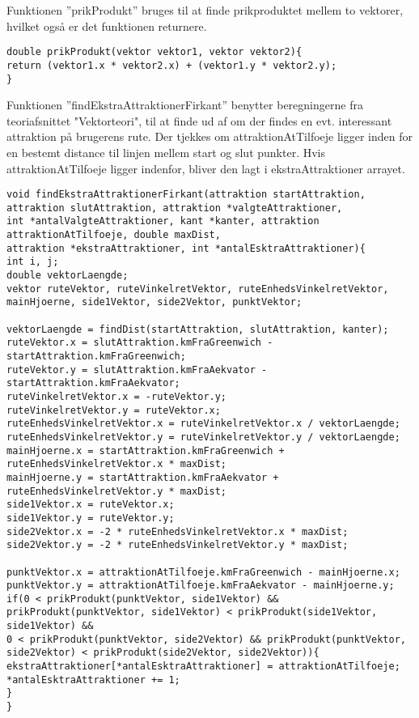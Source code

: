Funktionen ”prikProdukt” bruges til at finde prikproduktet mellem to vektorer, hvilket også er det funktionen returnere. \newline

\begin{lstlisting}
double prikProdukt(vektor vektor1, vektor vektor2){
return (vektor1.x * vektor2.x) + (vektor1.y * vektor2.y);
}
\end{lstlisting}

Funktionen ”findEkstraAttraktionerFirkant” benytter beregningerne fra teoriafsnittet "Vektorteori", til at finde ud af om der findes en evt. interessant attraktion på brugerens rute. Der tjekkes om attraktionAtTilfoeje ligger inden for en bestemt distance til linjen mellem start og slut punkter. Hvis attraktionAtTilfoeje ligger indenfor, bliver den lagt i ekstraAttraktioner arrayet. \newline

\begin{lstlisting}
void findEkstraAttraktionerFirkant(attraktion startAttraktion, attraktion slutAttraktion, attraktion *valgteAttraktioner, 
int *antalValgteAttraktioner, kant *kanter, attraktion attraktionAtTilfoeje, double maxDist, 
attraktion *ekstraAttraktioner, int *antalEsktraAttraktioner){
int i, j;
double vektorLaengde;
vektor ruteVektor, ruteVinkelretVektor, ruteEnhedsVinkelretVektor, mainHjoerne, side1Vektor, side2Vektor, punktVektor;

vektorLaengde = findDist(startAttraktion, slutAttraktion, kanter);
ruteVektor.x = slutAttraktion.kmFraGreenwich - startAttraktion.kmFraGreenwich;
ruteVektor.y = slutAttraktion.kmFraAekvator - startAttraktion.kmFraAekvator;
ruteVinkelretVektor.x = -ruteVektor.y;
ruteVinkelretVektor.y = ruteVektor.x;
ruteEnhedsVinkelretVektor.x = ruteVinkelretVektor.x / vektorLaengde;
ruteEnhedsVinkelretVektor.y = ruteVinkelretVektor.y / vektorLaengde;
mainHjoerne.x = startAttraktion.kmFraGreenwich + ruteEnhedsVinkelretVektor.x * maxDist;
mainHjoerne.y = startAttraktion.kmFraAekvator + ruteEnhedsVinkelretVektor.y * maxDist;
side1Vektor.x = ruteVektor.x;
side1Vektor.y = ruteVektor.y;
side2Vektor.x = -2 * ruteEnhedsVinkelretVektor.x * maxDist;
side2Vektor.y = -2 * ruteEnhedsVinkelretVektor.y * maxDist;

punktVektor.x = attraktionAtTilfoeje.kmFraGreenwich - mainHjoerne.x;
punktVektor.y = attraktionAtTilfoeje.kmFraAekvator - mainHjoerne.y;
if(0 < prikProdukt(punktVektor, side1Vektor) && prikProdukt(punktVektor, side1Vektor) < prikProdukt(side1Vektor, side1Vektor) &&
0 < prikProdukt(punktVektor, side2Vektor) && prikProdukt(punktVektor, side2Vektor) < prikProdukt(side2Vektor, side2Vektor)){
ekstraAttraktioner[*antalEsktraAttraktioner] = attraktionAtTilfoeje;
*antalEsktraAttraktioner += 1;
}
}
\end{lstlisting}

